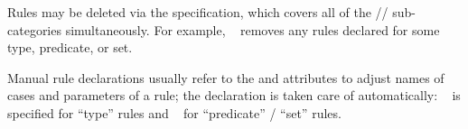 \begin{isabellebody}
\begin{isamarkuptext}
\begin{description}
  Rules may be deleted via the  specification, which
  covers all of the //
  sub-categories simultaneously.  For example, \hyperlink{attribute.cases}{\mbox{}}~ removes any \hyperlink{attribute.cases}{\mbox{}} rules declared for
  some type, predicate, or set.
  
  Manual rule declarations usually refer to the \hyperlink{attribute.case-names}{\mbox{}} and \hyperlink{attribute.params}{\mbox{}} attributes to adjust names of
  cases and parameters of a rule; the \hyperlink{attribute.consumes}{\mbox{}}
  declaration is taken care of automatically: \hyperlink{attribute.consumes}{\mbox{}}~ is specified for ``type'' rules and \hyperlink{attribute.consumes}{\mbox{}}~ for ``predicate'' / ``set'' rules.

  \end{description}%
\end{isamarkuptext}%
\isamarkuptrue%
%
\isadelimtheory
%
\endisadelimtheory
%
\isatagtheory
{}\isamarkupfalse%
%
\endisatagtheory
{\isafoldtheory}%
%
\isadelimtheory
%
\endisadelimtheory
\isanewline
\end{isabellebody}%
